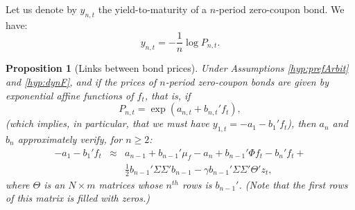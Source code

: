 \documentclass[
  12pt,
]{book}
\newtheorem{proposition}{Proposition}[chapter]
\theoremstyle{definition}
\theoremstyle{definition}
\theoremstyle{definition}
\theoremstyle{definition}
\theoremstyle{remark}
\begin{document}
Let us denote by \(y_{n,t}\) the yield-to-maturity of a \(n\)-period zero-coupon bond. We have:
\begin{equation}
y_{n,t} = - \frac{1}{n}\log P_{n,t}.\label{eq:Pandy}
\end{equation}

\begin{proposition}[Links between bond prices]
\protect\hypertarget{prp:prop111}{}\label{prp:prop111}Under Assumptions \ref{hyp:prefArbit} and \ref{hyp:dynF}, and if the prices of \(n\)-period zero-coupon bonds are given by exponential affine functions of \(f_t\), that is, if
\begin{equation}
P_{n,t} = \exp(a_{n,t} + b_{n,t}'f_t), \label{eq:PPs}    
\end{equation}
(which implies, in particular, that we must have \(y_{1,t} = - a_1 - b_1'f_t\)), then \(a_n\) and \(b_n\) approximately verify, for \(n \ge 2\):
\begin{eqnarray}
-a_1-b_1' f_t &\approx& a_{n-1} + b_{n-1}'\mu_f  - a_{n} + b_{n-1}'\Phi f_t - b_{n}'f_{t} + \nonumber \\ &&\frac{1}{2}b_{n-1}'\Sigma \Sigma'b_{n-1} - \gamma b_{n-1}'\Sigma\Sigma'\Theta' z_t, \label{eq:Lagr1B}
\end{eqnarray}
where \(\Theta\) is an \(N \times m\) matrices whose \(n^{th}\) rows is \(b_{n-1}'\). (Note that the first rows of this matrix is filled with zeros.)
\end{proposition}
\end{document}
